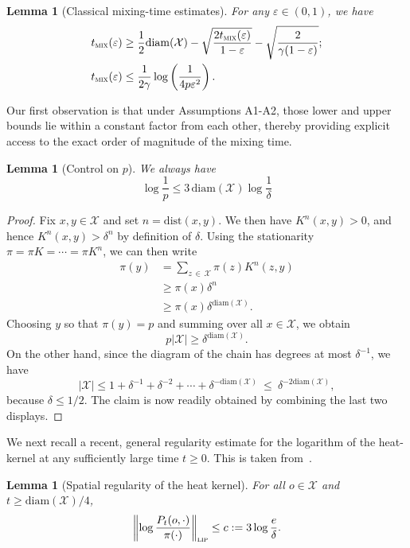 \documentclass[10pt]{amsart}
\newtheorem{lemm}[theo]{Lemma}\newtheorem{prop}[theo]{Proposition}\newtheorem{coro}[theo]{Corollary}\newtheorem{conj}[theo]{Conjecture}
\theoremstyle{definition}\newtheorem{defi}[theo]{Definition}\newtheorem{rema}[theo]{Remark}\newtheorem{exam}[theo]{Example}\newtheorem{exem}[theo]{Example}\newtheorem{nota}[theo]{Notation}
\newcommand{\cX}{\mathcal{X}}
\newcommand{\dist}{\mathrm{dist}}
\newcommand{\pim}{p}
\newcommand{\tmix}{t_{\textsc{mix}}}
\newcommand{\diam}{\mathrm{diam}}
\begin{document}
\begin{lemm}[Classical mixing-time estimates]\label{lm:tmix}
For any $\varepsilon\in(0,1)$, we have
\begin{align*}
\tmix(\varepsilon) & \ge \frac{1}{2}\diam(\cX)-\sqrt{\frac{2\tmix(\varepsilon)}{1-\varepsilon}}-\sqrt{\frac{2}{\gamma(1-\varepsilon)}};\\
\tmix(\varepsilon) & \le \frac{1}{2\gamma}\log\left(\frac{1}{4\pim\varepsilon^2}\right).
\end{align*}
\end{lemm}

Our first observation is that under Assumptions A1-A2, those lower and upper bounds lie within a constant factor from each other, thereby providing explicit access to the exact order of magnitude of the mixing time.

\begin{lemm}[Control on $\pim$]\label{lm:pim}
We always have
\[
\log \frac{1}{\pim} \le 3\,\diam(\cX)\log \frac{1}{\delta}
\]
\end{lemm}

\begin{proof}
Fix $x,y\in\cX$ and set $n=\dist(x,y)$. We then have $K^n(x,y)>0$, and hence $K^n(x,y)>\delta^n$ by definition of $\delta$. Using the stationarity $\pi=\pi K=\cdots =\pi K^n$, we can then write
\begin{align*}
\pi(y) & = \sum_{z\,\in\,\cX}\pi(z)K^n(z,y)\\
& \ge \pi(x)\delta^{n}\\
& \ge \pi(x)\delta^{\diam(\cX)}.
\end{align*}
Choosing $y$ so that $\pi(y)=\pim$ and summing over all $x\in\cX$, we obtain
\[
\pim|\cX| \ge \delta^{\diam(\cX)}.
\]
On the other hand, since the diagram of the chain has degrees at most $\delta^{-1}$, we have
\[
|\cX| \le 1+\delta^{-1}+\delta^{-2}+\cdots+\delta^{-\diam(\cX)} \ \le \ \delta^{-2\diam(\cX)},
\]
because $\delta\le 1/2$. The claim is now readily obtained by combining the last two displays.
\end{proof}

We next recall a recent, general regularity estimate for the logarithm of the heat-kernel at any sufficiently large time $t\ge 0$. This is taken from~\cite[Lemma~10]{arxiv.2102.05597}.

\begin{lemm}[Spatial regularity of the heat kernel]\label{lm:lip}
For all $o\in\cX$ and $t\ge \diam(\cX)/4$,
\[
\left\|\log \frac{P_t(o,\cdot)}{\pi(\cdot)}\right\|_{\textsc{lip}} \le c := 3\log \frac{e}{\delta}.
\]
\end{lemm}
\end{document}
